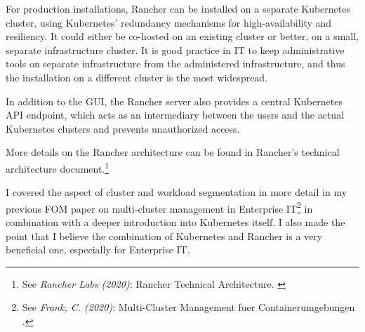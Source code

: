 For production installations, Rancher can be installed on a separate Kubernetes cluster, using Kubernetes' redundancy mechanisms for high-availability and resiliency. It could either be co-hosted on an existing cluster or better, on a small, separate infrastructure cluster. It is good practice in IT to keep administrative tools on separate infrastructure from the administered infrastructure, and thus the installation on a different cluster is the most widespread.

In addition to the GUI, the Rancher server also provides a central Kubernetes API endpoint, which acts as an intermediary between the users and the actual Kubernetes clusters and prevents unauthorized access.

More details on the Rancher architecture can be found in Rancher's technical architecture document.\footnote{See \textit{Rancher Labs (2020)}: Rancher Technical Architecture. \cite{technicalArchitecture}}

I covered the aspect of cluster and workload segmentation in more detail in my previous FOM paper on multi-cluster management in Enterprise IT\footnote{See \textit{Frank, C. (2020)}: Multi-Cluster Management fuer Containerumgebungen .\cite{previousPaper}} in combination with a deeper introduction into Kubernetes itself. I also made the point that I believe the combination of Kubernetes and Rancher is a very beneficial one, especially for Enterprise IT.
